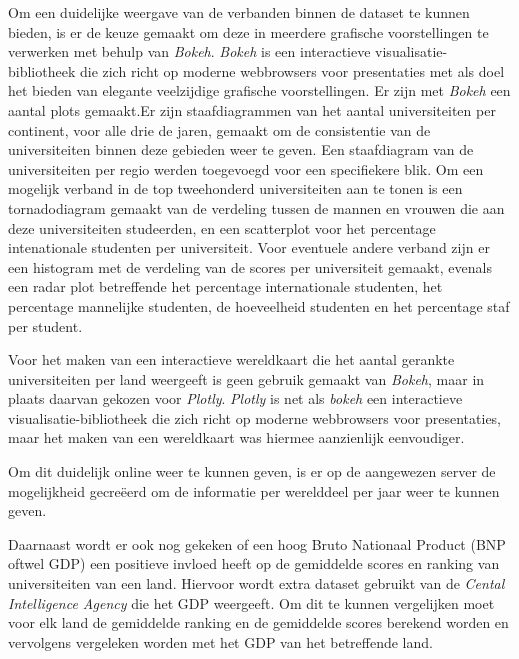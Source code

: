 \documentclass{uva-inf-article}
\begin{document}
Om een duidelijke weergave van de verbanden binnen de dataset te kunnen bieden, is er de keuze gemaakt om deze in meerdere grafische voorstellingen te verwerken met behulp van \textit{Bokeh}\cite{Bokeh}. \textit{Bokeh} is een interactieve visualisatie-bibliotheek die zich richt op moderne webbrowsers voor presentaties met als doel het bieden van elegante veelzijdige grafische voorstellingen.
Er zijn met \textit{Bokeh} een aantal plots gemaakt.Er zijn staafdiagrammen van het aantal universiteiten per continent, voor alle drie de jaren, gemaakt om de consistentie van de universiteiten binnen deze gebieden weer te geven. Een staafdiagram van de universiteiten per regio werden toegevoegd voor een specifiekere blik. Om een mogelijk verband in de top tweehonderd universiteiten aan te tonen is een tornadodiagram gemaakt van de verdeling tussen de mannen en vrouwen die aan deze universiteiten studeerden, en een scatterplot voor het percentage intenationale studenten per universiteit. Voor eventuele andere verband zijn er een histogram met de verdeling van de scores per universiteit gemaakt, evenals een radar plot betreffende het percentage internationale studenten, het percentage mannelijke studenten, de hoeveelheid studenten en het percentage staf per student. 

Voor het maken van een interactieve wereldkaart die het aantal gerankte universiteiten per land weergeeft is geen gebruik gemaakt van \textit{Bokeh}, maar in plaats daarvan gekozen voor \textit{Plotly}\cite{Plotly}. \textit{Plotly} is net als \textit{bokeh} een interactieve visualisatie-bibliotheek die zich richt op moderne webbrowsers voor presentaties, maar het maken van een wereldkaart was hiermee aanzienlijk eenvoudiger.

Om dit duidelijk online weer te kunnen geven, is er op de aangewezen server de mogelijkheid gecreëerd om de informatie per werelddeel per jaar weer te kunnen geven. 

Daarnaast wordt er ook nog gekeken of een hoog Bruto Nationaal Product (BNP oftwel GDP) een positieve invloed heeft op de gemiddelde scores en ranking van universiteiten van een land. Hiervoor wordt extra dataset gebruikt van de \textit{Cental Intelligence Agency} \cite{CIA} die het GDP weergeeft.
Om dit te kunnen vergelijken moet voor elk land de gemiddelde ranking en de gemiddelde scores berekend worden en vervolgens vergeleken worden met het GDP van het betreffende land.


\end{document}
